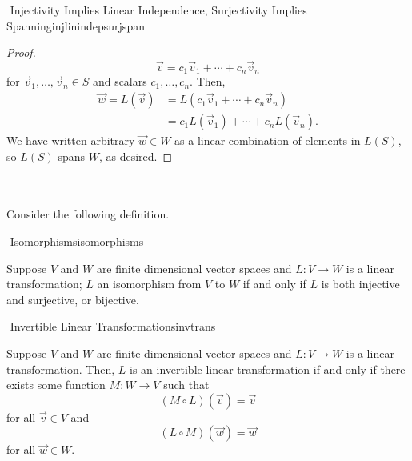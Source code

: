 \begin{theorem}{\Stop\,\,Injectivity Implies Linear Independence, Surjectivity Implies Spanning}{injlinindepsurjspan}
\begin{enumerate}
\begin{proof}
                    \begin{equation*}
                        \vec{v}=c_1\vec{v}_1+\cdots+c_n\vec{v}_n
                    \end{equation*}
                    for \(\vec{v}_1,\ldots,\vec{v}_n\in S\) and scalars \(c_1,\ldots,c_n\). Then, 
                    \begin{align*}
                        \vec{w}=L(\vec{v})&=L(c_1\vec{v}_1+\cdots+c_n\vec{v}_n) \\
                        &=c_1L(\vec{v}_1)+\cdots+c_nL(\vec{v}_n).
                    \end{align*}
                    We have written arbitrary \(\vec{w}\in W\) as a linear combination of elements in \(L(S)\), so \(L(S)\) spans \(W\), as desired.
                \end{proof}
            \end{enumerate}
            
        \end{theorem}
        \vphantom
        \\
        \\
        Consider the following definition.
        \begin{definition}{\Stop\,\,Isomorphisms}{isomorphisms}

            Suppose \(V\) and \(W\) are finite dimensional vector spaces and \(L:V\to W\) is a linear transformation; \(L\) an isomorphism from \(V\) to \(W\) if and only if \(L\) is both injective and surjective, or bijective.
            
        \end{definition}
        \begin{definition}{\Stop\,\,Invertible Linear Transformations}{invtrans}

            Suppose \(V\) and \(W\) are finite dimensional vector spaces and \(L:V\to W\) is a linear transformation. Then, \(L\) is an invertible linear transformation if and only if there exists some function \(M:W\to V\) such that
            \begin{equation*}
                (M\circ L)(\vec{v})=\vec{v}
            \end{equation*}
            for all \(\vec{v}\in V\) and
            \begin{equation*}
                (L\circ M)(\vec{w})=\vec{w}
            \end{equation*}
            for all \(\vec{w}\in W\).
            
        \end{definition}

